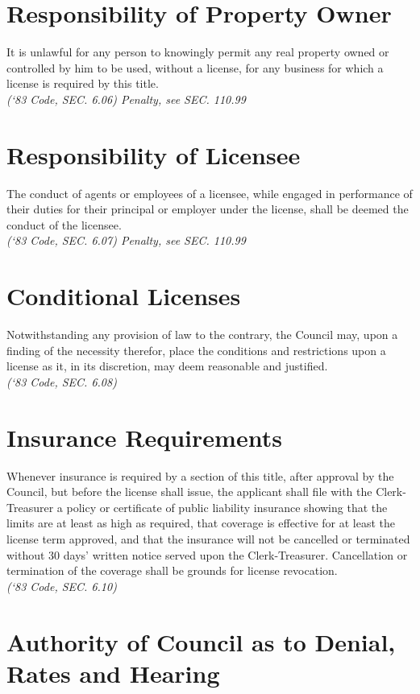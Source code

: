 \section{Responsibility of Property Owner}
It is unlawful for any person to knowingly permit any real property owned or controlled by him to be used, without a license, for any business for which a license is required by this title.\\
\emph{(‘83 Code, SEC. 6.06)  Penalty, see SEC. 110.99}

\section{Responsibility of Licensee}
The conduct of agents or employees of a licensee, while engaged in performance of their duties for their principal or employer under the license, shall be deemed the conduct of the licensee.\\
\emph{(‘83 Code, SEC. 6.07)  Penalty, see SEC. 110.99}

\section{Conditional Licenses}
Notwithstanding any provision of law to the contrary, the Council may, upon a finding of the necessity therefor, place the conditions and restrictions upon a license as it, in its discretion, may deem reasonable and justified.\\
\emph{(‘83 Code, SEC. 6.08)}

\section{Insurance Requirements}
Whenever insurance is required by a section of this title, after approval by the Council, but before the license shall issue, the applicant shall file with the Clerk-Treasurer a policy or certificate of public liability insurance showing that the limits are at least as high as required, that coverage is effective for at least the license term approved, and that the insurance will not be cancelled or terminated without 30 days’ written notice served upon the Clerk-Treasurer.  Cancellation or termination of the coverage shall be grounds for license revocation.\\
\emph{(‘83 Code, SEC. 6.10)}

\section{Authority of Council as to Denial, Rates and Hearing}
